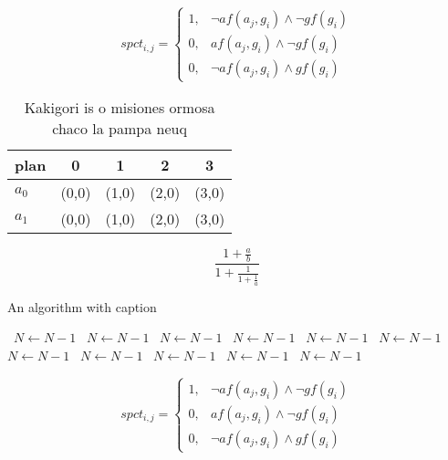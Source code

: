 \documentclass[a4paper]{article}
\begin{document}
\begin{equation}
spct_{i,j} =
\begin{cases}
1, & \text{$\neg af(a_j,g_i) \wedge \neg gf(g_i)$}\\
0, & \text{$af(a_j,g_i) \wedge \neg gf(g_i)$}\\
0, & \text{$\neg af(a_j,g_i) \wedge gf(g_i)$}
\end{cases}
\end{equation}

\begin{table}
\begin{adjustbox}{width=0.8\columnwidth}
\begin{tabular}{|l|l|l|l|l|}
\hline
\textbf{plan} & \multicolumn{1}{c|}{\textbf{0}} & \multicolumn{1}{c|}{\textbf{1}} & \multicolumn{1}{c|}{\textbf{2}} & \multicolumn{1}{c|}{\textbf{3}} \\ \hline
\textbf{$a_0$}  & (0,0) & (1,0) & (2,0) & (3,0) \\ \hline
\textbf{$a_1$}  & (0,0) & (1,0) & (2,0) & (3,0) \\ \hline
\end{tabular}
\end{adjustbox}
\caption{Kakigori is o misiones ormosa chaco la pampa neuq
}
\end{table}

\[ \frac{1+\frac{a}{b}}{1+\frac{1}{1+\frac{1}{a}}} \]

\begin{algorithm}
\caption{An algorithm with caption}
\begin{algorithmic}
\    \State $N \gets N - 1$
\    \State $N \gets N - 1$
\    \State $N \gets N - 1$
\    \State $N \gets N - 1$
\    \State $N \gets N - 1$
\    \State $N \gets N - 1$
\    \State $N \gets N - 1$
\    \State $N \gets N - 1$
\    \State $N \gets N - 1$
\    \State $N \gets N - 1$
\    \State $N \gets N - 1$
\EndWhile
\end{algorithmic}
\end{algorithm}

\begin{equation}
spct_{i,j} =
\begin{cases}
1, & \text{$\neg af(a_j,g_i) \wedge \neg gf(g_i)$}\\
0, & \text{$af(a_j,g_i) \wedge \neg gf(g_i)$}\\
0, & \text{$\neg af(a_j,g_i) \wedge gf(g_i)$}
\end{cases}
\end{equation}
\end{document}
